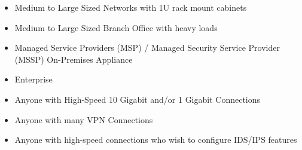 \begin{itemize}
    \item Medium to Large Sized Networks with 1U rack mount cabinets
    \item Medium to Large Sized Branch Office with heavy loads
    \item Managed Service Providers (MSP) / Managed Security Service Provider (MSSP) On-Premises Appliance
    \item Enterprise
    \item Anyone with High-Speed 10 Gigabit and/or 1 Gigabit Connections 
    \item Anyone with many VPN Connections
    \item Anyone with high-speed connections who wish to configure IDS/IPS features
\end{itemize}


